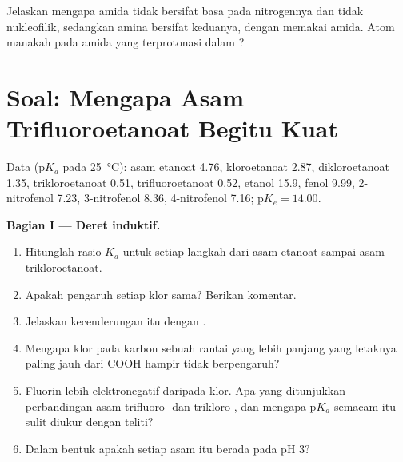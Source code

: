 \begin{exercise}[$\star\star\star$]\label{exo:b1:electronic-effects:12}
Jelaskan mengapa amida tidak bersifat basa pada nitrogennya dan tidak
nukleofilik, sedangkan amina bersifat keduanya, dengan memakai  amida. Atom manakah pada amida yang terprotonasi dalam ?
\end{exercise}

\section{Soal: Mengapa Asam Trifluoroetanoat Begitu Kuat}

\begin{problem}
\label{pb:b1:electronic-effects:1}
Data ($\mathrm{p}K_a$ pada \qty{25}{\celsius}): asam etanoat 4.76,
kloroetanoat 2.87, dikloroetanoat 1.35, trikloroetanoat 0.51,
trifluoroetanoat 0.52, etanol 15.9, fenol 9.99, 2-nitrofenol 7.23,
3-nitrofenol 8.36, 4-nitrofenol 7.16; $\mathrm{p}K_e = 14.00$.

\medskip
\noindent\textbf{Bagian I --- Deret induktif.}
\begin{enumerate}
  \item Hitunglah rasio $K_a$ untuk setiap langkah dari asam etanoat
        sampai asam trikloroetanoat.
  \item Apakah pengaruh setiap klor sama? Berikan komentar.
  \item Jelaskan kecenderungan itu dengan .
  \item Mengapa klor pada karbon sebuah rantai yang lebih panjang yang
        letaknya paling jauh dari COOH hampir tidak berpengaruh?
  \item Fluorin lebih elektronegatif daripada klor. Apa yang ditunjukkan
        perbandingan asam trifluoro- dan trikloro-, dan mengapa
        $\mathrm{p}K_a$ semacam itu sulit diukur dengan teliti?
  \item Dalam bentuk apakah setiap asam itu berada pada pH 3?
\end{enumerate}


\end{problem}
